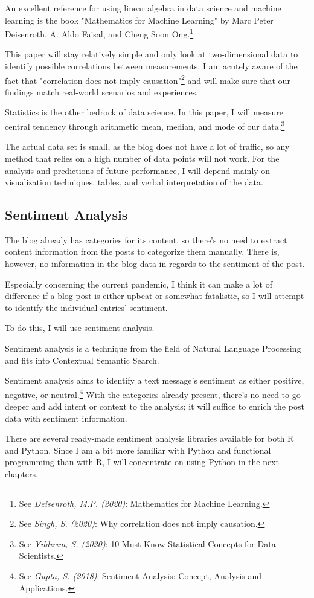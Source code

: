 An excellent reference for using linear algebra in data science and machine learning is the book "Mathematics for Machine Learning" by Marc Peter Deisenroth, A. Aldo Faisal, and Cheng Soon Ong.\footnote{See \textit{Deisenroth, M.P. (2020)}: Mathematics for Machine Learning.\cite{mathematicsML}}

This paper will stay relatively simple and only look at two-dimensional data to identify possible correlations between measurements. I am acutely aware of the fact that "correlation does not imply causation"\footnote{See \textit{Singh, S. (2020)}: Why correlation does not imply causation.\cite{correlateCause}} and will make sure that our findings match real-world scenarios and experiences.

Statistics is the other bedrock of data science. In this paper, I will measure central tendency through arithmetic mean, median, and mode of our data.\footnote{See \textit{Yıldırım, S. (2020)}: 10 Must-Know Statistical Concepts for Data Scientists.\cite{bedrockScience}}

The actual data set is small, as the blog does not have a lot of traffic, so any method that relies on a high number of data points will not work. For the analysis and predictions of future performance, I will depend mainly on visualization techniques, tables, and verbal interpretation of the data.

\subsection{Sentiment Analysis}

The blog already has categories for its content, so there's no need to extract content information from the posts to categorize them manually. There is, however, no information in the blog data in regards to the sentiment of the post.

Especially concerning the current pandemic, I think it can make a lot of difference if a blog post is either upbeat or somewhat fatalistic, so I will attempt to identify the individual entries' sentiment.

To do this, I will use sentiment analysis. 

Sentiment analysis is a technique from the field of Natural Language Processing and fits into Contextual Semantic Search. 

Sentiment analysis aims to identify a text message's sentiment as either positive, negative, or neutral.\footnote{See \textit{Gupta, S. (2018)}: Sentiment Analysis: Concept, Analysis and Applications.\cite{sentimentAnalysis}} With the categories already present, there's no need to go deeper and add intent or context to the analysis; it will suffice to enrich the post data with sentiment information.

There are several ready-made sentiment analysis libraries available for both R and Python. Since I am a bit more familiar with Python and functional programming than with R, I will concentrate on using Python in the next chapters.
